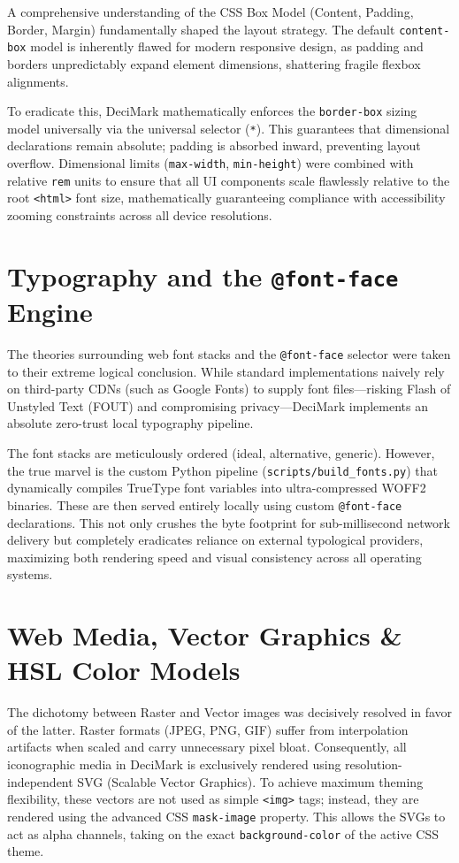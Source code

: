 \documentclass[11pt,a4paper]{book}
\begin{document}
A comprehensive understanding of the CSS Box Model (Content, Padding, Border, Margin) fundamentally shaped the layout strategy. The default \texttt{content-box} model is inherently flawed for modern responsive design, as padding and borders unpredictably expand element dimensions, shattering fragile flexbox alignments.

To eradicate this, DeciMark mathematically enforces the \texttt{border-box} sizing model universally via the universal selector (\texttt{*}). This guarantees that dimensional declarations remain absolute; padding is absorbed inward, preventing layout overflow. Dimensional limits (\texttt{max-width}, \texttt{min-height}) were combined with relative \texttt{rem} units to ensure that all UI components scale flawlessly relative to the root \texttt{<html>} font size, mathematically guaranteeing compliance with accessibility zooming constraints across all device resolutions.

\section{Typography and the \texttt{@font-face} Engine}

The theories surrounding web font stacks and the \texttt{@font-face} selector were taken to their extreme logical conclusion. While standard implementations naively rely on third-party CDNs (such as Google Fonts) to supply font files---risking Flash of Unstyled Text (FOUT) and compromising privacy---DeciMark implements an absolute zero-trust local typography pipeline.

The font stacks are meticulously ordered (ideal, alternative, generic). However, the true marvel is the custom Python pipeline (\texttt{scripts/build\_fonts.py}) that dynamically compiles TrueType font variables into ultra-compressed WOFF2 binaries. These are then served entirely locally using custom \texttt{@font-face} declarations. This not only crushes the byte footprint for sub-millisecond network delivery but completely eradicates reliance on external typological providers, maximizing both rendering speed and visual consistency across all operating systems.

\section{Web Media, Vector Graphics \& HSL Color Models}

The dichotomy between Raster and Vector images was decisively resolved in favor of the latter. Raster formats (JPEG, PNG, GIF) suffer from interpolation artifacts when scaled and carry unnecessary pixel bloat. Consequently, all iconographic media in DeciMark is exclusively rendered using resolution-independent SVG (Scalable Vector Graphics). To achieve maximum theming flexibility, these vectors are not used as simple \texttt{<img>} tags; instead, they are rendered using the advanced CSS \texttt{mask-image} property. This allows the SVGs to act as alpha channels, taking on the exact \texttt{background-color} of the active CSS theme.
\end{document}
